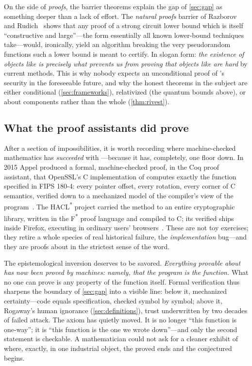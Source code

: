 On the side of \emph{proofs}, the barrier theorems explain the gap of
\cref{sec:gap} as something deeper than a lack of effort. The
\emph{natural proofs} barrier of Razborov and
Rudich~\citep{RazborovRudich1997} shows that any proof of a strong
circuit lower bound which is itself ``constructive and large''---the form
essentially all known lower-bound techniques take---would, ironically,
yield an algorithm breaking the very pseudorandom functions such a lower
bound is meant to certify. In slogan form: \emph{the existence of objects
like \SHA{} is precisely what prevents us from proving that objects like
\SHA{} are hard} by current methods. This is why nobody expects an
unconditional proof of \SHA{}'s security in the foreseeable future, and
why the honest theorems in the subject are either conditional
(\cref{sec:frameworks}), relativized (the quantum bounds above), or about
components rather than the whole (\cref{thm:rivest}).

\subsection{What the proof assistants did prove}\label{sec:verified}

After a section of impossibilities, it is worth recording where
machine-checked mathematics has \emph{succeeded} with \SHA{}---because
it has, completely, one floor down. In 2015 Appel produced a formal,
machine-checked proof, in the Coq proof assistant, that OpenSSL's C
implementation of \SHA{} computes exactly the function specified in
FIPS 180-4: every pointer offset, every rotation, every corner of C
semantics, verified down to a mechanized model of the
compiler's view of the program~\citep{Appel2015}. The HACL\textsuperscript{*}
project carried the method to an entire cryptographic library, written
in the F\textsuperscript{*} proof language and compiled to C; its
verified \SHA{} ships inside Firefox, executing in ordinary users'
browsers~\citep{Zinzindohoue2017}. These are not toy exercises; they
retire a whole species of real historical failure, the
\emph{implementation} bug---and they are proofs about \SHA{} in the
strictest sense of the word.

The epistemological inversion deserves to be savored. \emph{Everything
provable about \SHA{} has now been proved by machines: namely, that the
program is the function.} What no one can prove is any property of the
function itself. Formal verification thus sharpens the boundary of
\cref{sec:gap} into a visible line: below it, mechanized
certainty---code equals specification, checked symbol by symbol; above
it, Rogaway's human ignorance (\cref{sec:definitions}), trust
underwritten by two decades of failed attack. The axiom has quietly
moved. It is no longer ``this function is one-way''; it is ``this
function is the one we wrote down''---and only the second statement is
checkable. A mathematician could not ask for a cleaner exhibit of where,
exactly, in one industrial object, the proved ends and the conjectured
begins.

